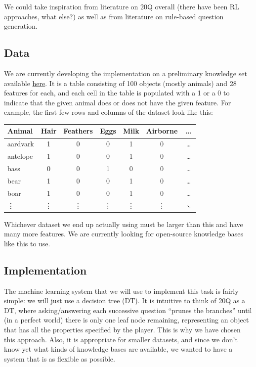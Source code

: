 \documentclass[a4paper,12pt]{article}
\begin{document}
We could take inspiration from literature on 20Q overall (there have been RL approaches, what else?) as well as from literature on rule-based question generation.

\subsection*{Data}
We are currently developing the implementation on a preliminary knowledge set available \href{https://github.com/drdevinhopkins/20_Questions/blob/master/knowledge_base.csv}{here}.
It is a table consisting of 100 objects (mostly animals) and 28 features for each, and each cell in the table is populated with a 1 or a 0 to indicate that the given animal does or does not have the given feature.
For example, the first few rows and columns of the dataset look like this:

\begin{center}
	\begin{tabular}{lcccccc}
	\toprule
Animal & Hair & Feathers & Eggs & Milk & Airborne & \ldots \\ \midrule
aardvark & 1 & 0 & 0 & 1 & 0 & \ldots \\
antelope & 1 & 0 & 0 & 1 & 0 & \ldots \\
bass & 0 & 0 & 1 & 0 & 0 & \ldots \\
bear & 1 & 0 & 0 & 1 & 0 & \ldots \\
boar & 1 & 0 & 0 & 1 & 0 & \ldots \\
\vdots & \vdots & \vdots & \vdots & \vdots & \vdots & $\ddots$ \\
\bottomrule
\end{tabular}
\end{center}

Whichever dataset we end up actually using must be larger than this and have many more features.
We are currently looking for open-source knowledge bases like this to use.


\subsection*{Implementation}

The machine learning system that we will use to implement this task is fairly simple: we will just use a decision tree (DT).
It is intuitive to think of 20Q as a DT, where asking/answering each successive question ``prunes the branches'' until (in a perfect world) there is only one leaf node remaining, representing an object that has all the properties specified by the player.
This is why we have chosen this approach.
Also, it is appropriate for smaller datasets, and since we don't know yet what kinds of knowledge bases are available, we wanted to have a system that is as flexible as possible.
\end{document}
